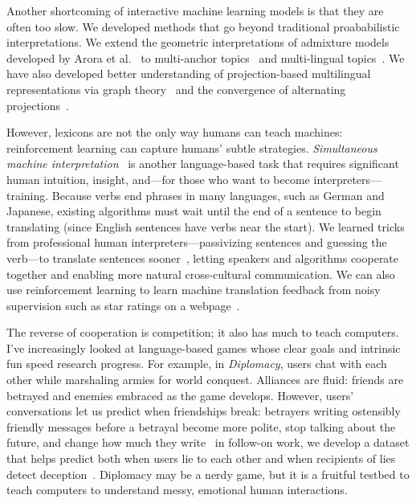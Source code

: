 
Another shortcoming of interactive machine learning models is that they are
often too slow. We developed methods that go beyond traditional proababilistic
interpretations. We extend the geometric interpretations of admixture models
developed by Arora et al.~\cite{arora-12} to multi-anchor topics~\cite{lund-17}
and multi-lingual topics~\cite{Yuan-18}. We have also developed better
understanding of projection-based multilingual representations via graph
theory~\cite{Fujinuma-19} and the convergence of alternating
projections~\cite{Zhang-19}.

However, lexicons are not the only way humans can teach machines: reinforcement learning can capture humans' subtle strategies.
\emph{Simultaneous machine
  interpretation}~\cite{Grissom:He:Boyd-Graber:Morgan-2014} is another
language-based task that requires significant human intuition,
insight, and---for those who want to become
interpreters---training. Because verbs end phrases in many languages,
such as German and Japanese, existing algorithms must wait until the
end of a sentence to begin translating (since English sentences have
verbs near the start). We learned tricks from professional human
interpreters---passivizing sentences and guessing the verb---to
translate sentences sooner~\cite{He-15}, letting speakers and
algorithms cooperate together and enabling more natural cross-cultural
communication.  We can also use reinforcement learning to learn
machine translation feedback from noisy supervision such as star
ratings on a webpage~\cite{nguyen-17}.

The reverse of cooperation is competition; it also has much to teach computers.
I've increasingly looked at language-based games whose clear goals and
intrinsic fun speed research progress. For example, in \emph{Diplomacy}, users
chat with each other while marshaling armies for world conquest. Alliances are
fluid: friends are betrayed and enemies embraced as the game develops. However,
users' conversations let us predict when friendships break: betrayers writing
ostensibly friendly messages before a betrayal become more polite, stop talking
about the future, and change how much they write~\cite{niculae-15} in follow-on
work, we develop a dataset that helps predict both when users lie to each other
and when recipients of lies detect deception~\cite{Peskov-20}. Diplomacy may be
a nerdy game, but it is a fruitful testbed to teach computers to understand
messy, emotional human interactions.

